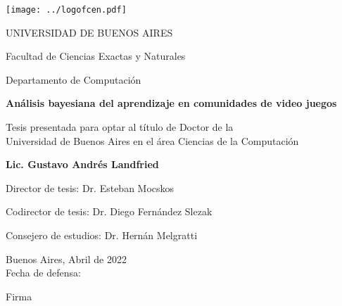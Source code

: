 \documentclass[a4paper,11pt]{book}
\author{Gustavo Landfried}
\makeatletter
\renewcommand{\frontmatter}{\cleardoublepage\@mainmatterfalse}
\theoremstyle{definition}
\newcommand{\TITULO}[0]{Análisis bayesiana del aprendizaje en comunidades de video juegos}
\makeatother
\begin{document}
\deactivatequoting %

\frontmatter
{}

\begin{center}

\texttt{[image: ../logofcen.pdf]}

\medskip
UNIVERSIDAD DE BUENOS AIRES

Facultad de Ciencias Exactas y Naturales

Departamento de Computaci\'on


\vspace{3cm}

\textbf{\LARGE \TITULO}

\vspace{1cm}



Tesis presentada para optar al t\'itulo de Doctor de la \\
Universidad de Buenos Aires en el \'area Ciencias de la Computaci\'on

\vspace{2.5cm}

\textbf{Lic. Gustavo Andr\'es Landfried}

\end{center}

\vspace{2.5cm}

\noindent Director de tesis: Dr. Esteban Mocskos

\noindent Codirector de tesis: Dr. Diego Fern\'andez Slezak

\noindent Consejero de estudios: Dr. Hern\'an Melgratti \\


\vspace{0.5cm}

\noindent Buenos Aires, Abril de 2022\\

\noindent Fecha de defensa: \\%

\vspace{0.5cm}

\hspace*{0pt}\hfill Firma \hspace{2cm}
\end{document}
